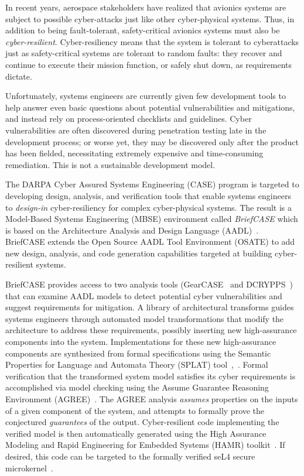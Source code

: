 In recent years, aerospace stakeholders have realized that avionics systems are subject to possible cyber-attacks just like other cyber-physical systems.  Thus, in addition to being fault-tolerant, safety-critical avionics systems must also be {\em cyber-resilient}. Cyber-resiliency means that the system is tolerant to cyberattacks just as safety-critical systems are tolerant to random faults: they recover and continue to execute their mission function, or safely shut down, as requirements dictate. 

Unfortunately, systems engineers are currently given few development tools to help answer even basic questions about potential vulnerabilities and mitigations, and instead rely on process-oriented checklists and guidelines.  Cyber vulnerabilities are often discovered during penetration testing late in the development process; or worse yet, they may be discovered only after the product has been fielded, necessitating extremely expensive and time-consuming remediation. This is not a sustainable development model.

The DARPA Cyber Assured Systems Engineering (CASE) program is targeted to developing design, analysis, and verification tools that enable systems engineers to {\em design-in} cyber-resiliency for complex cyber-physical systems.
The result is a Model-Based Systems Engineering (MBSE) environment called {\em BriefCASE} which is based on the Architecture Analysis and Design Language (AADL)~\cite{aadl}.  BriefCASE extends the Open Source AADL Tool Environment (OSATE) to add new design, analysis, and code generation capabilities targeted at building cyber-resilient systems.  

BriefCASE provides access to two analysis tools (GearCASE~\cite{gearcase2020} and DCRYPPS~\cite{dcrypps2019}) that can examine AADL models to detect potential cyber vulnerabilities and suggest requirements for mitigation.  
A library of architectural transforms guides systems engineers through automated model transformations that modify the architecture to address these requirements, possibly inserting new high-assurance components into the system. 
Implementations for these new high-assurance components are synthesized from formal specifications using the Semantic Properties for Language and Automata Theory (SPLAT) tool~\cite{slind-hcss2020},~\cite{formal-filter-synth-langsec}.
Formal verification that the transformed system model satisfies its cyber requirements is accomplished via model checking using the Assume Guarantee Reasoning Environment (AGREE)~\cite{agree2013}.  The AGREE analysis \emph{assumes}  properties on the inputs of a given component of the system, and attempts to formally prove the conjectured \emph{guarantees} of the output.  Cyber-resilient code implementing the verified model is then automatically generated using the High Assurance Modeling and Rapid Engineering for Embedded Systems (HAMR) toolkit~\cite{hamr}.  If desired, this code can be targeted to the formally verified seL4 secure microkernel~\cite{sel4-2009}.

